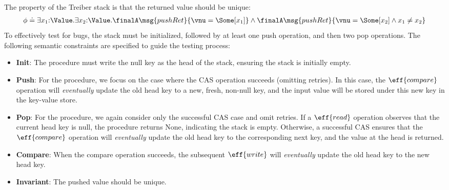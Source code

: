 The property of the Treiber stack is that the returned value should be unique:
\begin{align*}
    \phi \doteq \exists x_1{:}\Value. \exists x_2{:}\Value. \finalA \msg{pushRet}{\vnu = \Some[x_1]} \land \finalA \msg{pushRet}{\vnu = \Some[x_2] \land x_1 \not= x_2}
\end{align*}\noindent
To effectively test for bugs, the stack must be initialized, followed by at least one push operation, and then two pop operations. The following semantic constraints are specified to guide the testing process:
\begin{itemize}
    \item \textbf{Init}: The  procedure must write the null key as the head of the stack, ensuring the stack is initially empty.
    \item \textbf{Push}: For the  procedure, we focus on the case where the CAS operation succeeds (omitting retries). In this case, the $\eff{compare}$ operation will \emph{eventually} update the old head key to a new, fresh, non-null key, and the input value will be stored under this new key in the key-value store.
    \item \textbf{Pop}: For the  procedure, we again consider only the successful CAS case and omit retries. If a $\eff{read}$ operation observes that the current head key is null, the procedure returns None, indicating the stack is empty. Otherwise, a successful CAS ensures that the $\eff{compare}$ operation will \emph{eventually} update the old head key to the corresponding next key, and the value at the head is returned.
    \item \textbf{Compare}: When the compare operation succeeds, the subsequent $\eff{write}$ will \emph{eventually} update the old head key to the new head key.
    \item \textbf{Invariant}: The pushed value should be unique.
\end{itemize}

